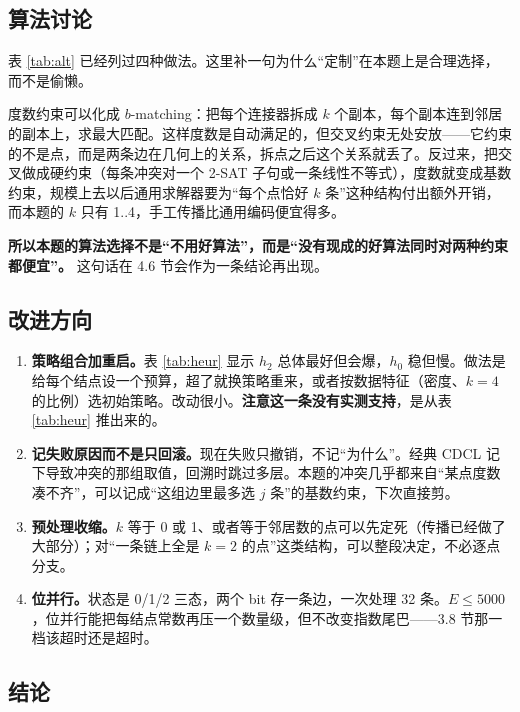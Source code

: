 \documentclass[12pt,a4paper,fontset=windows]{ctexart}
\begin{document}
\subsection{算法讨论}

表 \ref{tab:alt} 已经列过四种做法。这里补一句为什么“定制”在本题上是合理选择，而不是偷懒。

度数约束可以化成 $b$-matching：把每个连接器拆成 $k$ 个副本，每个副本连到邻居的副本上，求最大匹配。这样度数是自动满足的，但交叉约束无处安放——它约束的不是点，而是两条边在几何上的关系，拆点之后这个关系就丢了。反过来，把交叉做成硬约束（每条冲突对一个 2-SAT 子句或一条线性不等式），度数就变成基数约束，规模上去以后通用求解器要为“每个点恰好 $k$ 条”这种结构付出额外开销，而本题的 $k$ 只有 1..4，手工传播比通用编码便宜得多。

\textbf{所以本题的算法选择不是“不用好算法”，而是“没有现成的好算法同时对两种约束都便宜”。} 这句话在 4.6 节会作为一条结论再出现。

\subsection{改进方向}

\begin{enumerate}[itemsep=3pt,topsep=2pt]
  \item \textbf{策略组合加重启。}表 \ref{tab:heur} 显示 $h_2$ 总体最好但会爆，$h_0$ 稳但慢。做法是给每个结点设一个预算，超了就换策略重来，或者按数据特征（密度、$k=4$ 的比例）选初始策略。改动很小。\textbf{注意这一条没有实测支持}，是从表 \ref{tab:heur} 推出来的。
  \item \textbf{记失败原因而不是只回滚。}现在失败只撤销，不记“为什么”。经典 CDCL 记下导致冲突的那组取值，回溯时跳过多层。本题的冲突几乎都来自“某点度数凑不齐”，可以记成“这组边里最多选 $j$ 条”的基数约束，下次直接剪。
  \item \textbf{预处理收缩。}$k$ 等于 0 或 1、或者等于邻居数的点可以先定死（传播已经做了大部分）；对“一条链上全是 $k=2$ 的点”这类结构，可以整段决定，不必逐点分支。
  \item \textbf{位并行。}状态是 0/1/2 三态，两个 bit 存一条边，一次处理 32 条。$E\le5000$，位并行能把每结点常数再压一个数量级，但不改变指数尾巴——3.8 节那一档该超时还是超时。
\end{enumerate}

\subsection{结论}
\end{document}
